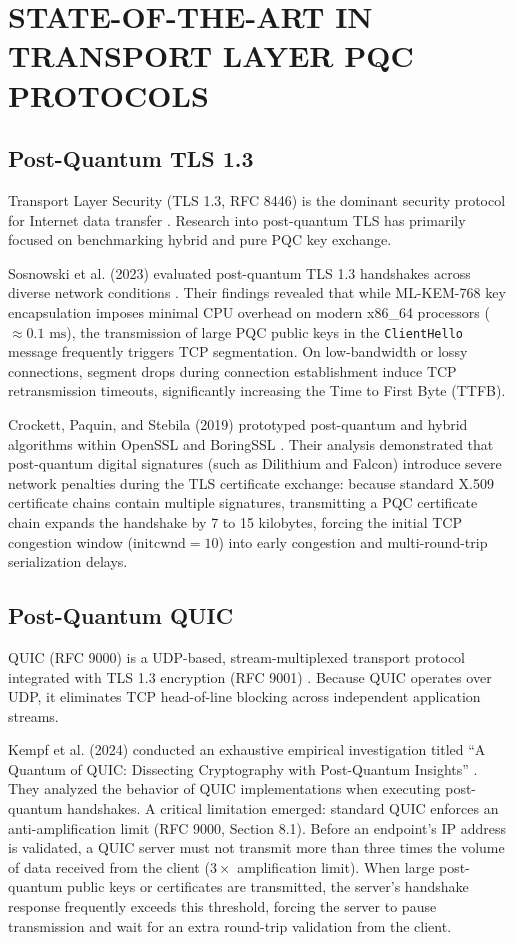 \section{STATE-OF-THE-ART IN TRANSPORT LAYER PQC PROTOCOLS}

\subsection{Post-Quantum TLS 1.3}
Transport Layer Security (TLS 1.3, RFC 8446) is the dominant security protocol for Internet data transfer \cite{rfc8446}. Research into post-quantum TLS has primarily focused on benchmarking hybrid and pure PQC key exchange. 

Sosnowski et al. (2023) evaluated post-quantum TLS 1.3 handshakes across diverse network conditions \cite{sosnowski2023performance}. Their findings revealed that while ML-KEM-768 key encapsulation imposes minimal CPU overhead on modern x86\_64 processors ($\approx 0.1\text{ ms}$), the transmission of large PQC public keys in the \texttt{ClientHello} message frequently triggers TCP segmentation. On low-bandwidth or lossy connections, segment drops during connection establishment induce TCP retransmission timeouts, significantly increasing the Time to First Byte (TTFB).

Crockett, Paquin, and Stebila (2019) prototyped post-quantum and hybrid algorithms within OpenSSL and BoringSSL \cite{crockett2019prototyping}. Their analysis demonstrated that post-quantum digital signatures (such as Dilithium and Falcon) introduce severe network penalties during the TLS certificate exchange: because standard X.509 certificate chains contain multiple signatures, transmitting a PQC certificate chain expands the handshake by 7 to 15 kilobytes, forcing the initial TCP congestion window ($\text{initcwnd} = 10$) into early congestion and multi-round-trip serialization delays.

\subsection{Post-Quantum QUIC}
QUIC (RFC 9000) is a UDP-based, stream-multiplexed transport protocol integrated with TLS 1.3 encryption (RFC 9001) \cite{rfc9000, rfc9001}. Because QUIC operates over UDP, it eliminates TCP head-of-line blocking across independent application streams. 

Kempf et al. (2024) conducted an exhaustive empirical investigation titled ``A Quantum of QUIC: Dissecting Cryptography with Post-Quantum Insights'' \cite{kempf2024quantum}. They analyzed the behavior of QUIC implementations when executing post-quantum handshakes. A critical limitation emerged: standard QUIC enforces an anti-amplification limit (RFC 9000, Section 8.1). Before an endpoint's IP address is validated, a QUIC server must not transmit more than three times the volume of data received from the client ($3\times$ amplification limit). When large post-quantum public keys or certificates are transmitted, the server's handshake response frequently exceeds this threshold, forcing the server to pause transmission and wait for an extra round-trip validation from the client.


